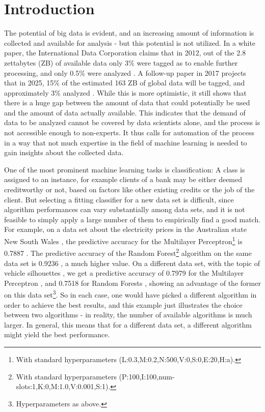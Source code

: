 \chapter{Introduction}
\label{sec:intro}

The potential of big data is evident, and an increasing amount of information is collected and available for analysis - but this potential is not utilized. In a white paper, the International Data Corporation claims that in 2012, out of the 2.8 zettabytes (ZB) of available data only 3\% were tagged as to enable further processing, and only 0.5\% were analyzed \cite{gantz2012the}. A follow-up paper in 2017 projects that in 2025, 15\% of the estimated 163 ZB of global data will be tagged, and approximately 3\% analyzed \cite{gantz2017data}. While this is more optimistic, it still shows that there is a huge gap between the amount of data that could potentially be used and the amount of data actually available. This indicates that the demand of data to be analyzed cannot be covered by data scientists alone, and the process is not accessible enough to non-experts. It thus calls for automation of the process in a way that not much expertise in the field of machine learning is needed to gain insights about the collected data.

One of the most prominent machine learning tasks is classification: A class is assigned to an instance, for example clients of a bank may be either deemed creditworthy or not, based on factors like other existing credits or the job of the client. But selecting a fitting classifier for a new data set is difficult, since algorithm performances can vary substantially among data sets, and it is not feasible to simply apply a large number of them to empirically find a good match. For example, on a data set about the electricity prices in the Australian state New South Wales \cite{harris1999splice}, the predictive accuracy for the Multilayer Perceptron\footnote{With standard hyperparameters (L:0.3,M:0.2,N:500,V:0,S:0,E:20,H:a).} is 0.7887 \cite{cachada2017run3}. The predictive accuracy of the Random Forest\footnote{With standard hyperparameters (P:100,I:100,num-slots:1,K:0,M:1.0,V:0.001,S:1).} algorithm on the same data set is 0.9236 \cite{cachada2017run}, a much higher value. On a different data set, with the topic of vehicle silhouettes \cite{siebert1987vehicle}, we get a predictive accuracy of 0.7979 for the Multilayer Perceptron \cite{cachada2017run4}, and 0.7518 for Random Forests \cite{cachada2017run2}, showing an advantage of the former on this data set\footnote{Hyperparameters as above.}. So in each case, one would have picked a different algorithm in order to achieve the best results, and this example just illustrates the choice between two algorithms - in reality, the number of available algorithms is much larger. In general, this means that for a different data set, a different algorithm might yield the best performance.

